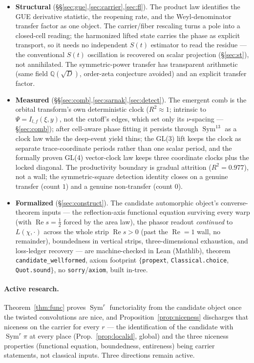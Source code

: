 \documentclass[11pt]{article}
\theoremstyle{definition}
\renewcommand{\Re}{\operatorname{Re}}
\newcommand{\Sym}{\operatorname{Sym}}
\begin{document}
\begin{itemize}
\item \textbf{Structural} (\S\S\ref{sec:gue},\ref{sec:carrier},\ref{sec:fl}). The product law
identifies the GUE derivative statistic, the reopening rate, and the Weyl-denominator transfer factor
as one object. The carrier/fiber rescaling turns a pole into a closed-cell reading; the harmonized lifted state
carries the phase as explicit transport, so it needs no independent $S(t)$ estimator to read the residue --- the
conventional $S(t)$ oscillation is recovered on scalar projection (\S\ref{sec:st}), not annihilated. The
symmetric-power transfer has transparent arithmetic (same field $\mathbb Q(\sqrt D)$, order-zeta conjecture
avoided) and an explicit transfer factor.

\item \textbf{Measured} (\S\S\ref{sec:comb},\ref{sec:sarnak},\ref{sec:detect}). The emergent comb is the orbital
transform's own deterministic clock ($R^2\approx1$; intrinsic to $\Psi=I_{l,f}(\xi,y)$, not the cutoff's edges,
which set only its $\nu$-spacing --- \S\ref{sec:comb}); after cell-aware phase fitting it persists through
$\Sym^{13}$ as a clock law while the deep-event yield thins; the GL(3) lift keeps the clock as separate
trace-coordinate periods rather than one scalar period, and the formally proven GL(4) vector-clock law keeps
three coordinate clocks plus the locked diagonal. The productivity boundary is gradual attrition
($R^2=0.977$), not a wall; the symmetric-square detection identity closes on a genuine transfer
(count $1$) and a genuine non-transfer (count $0$).

\item \textbf{Formalized} (\S\ref{sec:construct}). The candidate automorphic object's converse-theorem
inputs --- the reflection-axis functional equation surviving every warp (with $\Re s=\tfrac12$ forced
by the area law), the phasor readout \emph{continued} to $L(\chi,\cdot)$ across the whole strip
$\Re s>0$ (past the $\Re=1$ wall, no remainder), boundedness in vertical strips, three-dimensional
exhaustion, and loss-ledger recovery --- are machine-checked in Lean (Mathlib), theorem
\texttt{candidate\_wellformed}, axiom footprint $\{$\texttt{propext}, \texttt{Classical.choice},
\texttt{Quot.sound}$\}$, no \texttt{sorry}/\texttt{axiom}, built in-tree.
\end{itemize}

\paragraph{Active research.} Theorem~\ref{thm:func} proves $\Sym^r$ functoriality from the candidate
object once the twisted convolutions are nice, and Proposition~\ref{prop:niceness} discharges that
niceness on the carrier for every $r$ --- the identification of the candidate with $\Sym^r\pi$ at every
place (Prop.~\ref{prop:localid}, global) and the three niceness properties (functional equation,
boundedness, entireness) being carrier statements, not classical inputs. Three directions remain active.
\end{document}
